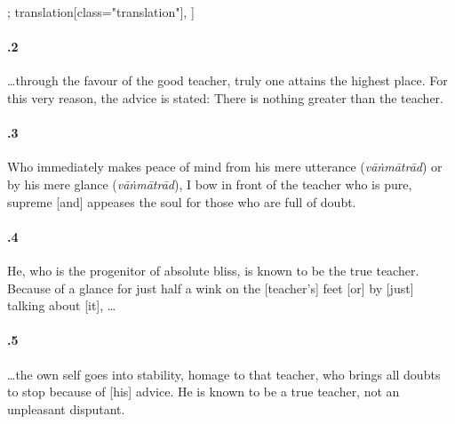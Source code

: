 \begin{alignment}[
  texts=edition[class="edition"];
  translation[class="translation"],
  ]
\begin{translation}
\begin{tlate}[57_2]
\paragraph{.2} \ldots through the favour of the good teacher, truly one attains the highest place. For this very reason, the advice is stated: There is nothing greater than the teacher.
\end{tlate}
\begin{tlate}[57_3]
\paragraph{.3} Who immediately makes peace of mind from his mere utterance (\textit{vāṅmātrād}) or by his mere glance (\textit{vāṅmātrād}), I bow in front of the teacher who is pure, supreme [and] appeases the soul for those who are full of doubt.
\end{tlate}
\begin{tlate}[57_4]
\paragraph{.4} He, who is the progenitor of absolute bliss, is known to be the true teacher. Because of a glance for just half a wink on the [teacher's] feet [or] by [just] talking about [it], \ldots
\end{tlate}
\begin{tlate}[57_5]
  \paragraph{.5} \ldots the own self goes into stability, homage to that teacher, who brings all doubts to stop because of [his] advice. He is known to be a true teacher, not an unpleasant disputant.
  \end{tlate}
  \end{translation}
\end{alignment}
\pagebreak %
